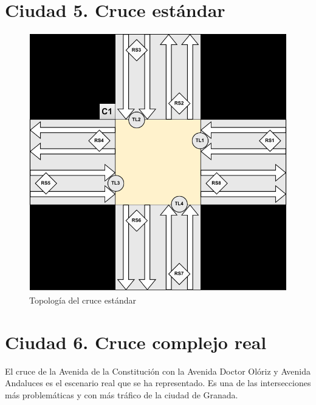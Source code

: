 \section{Ciudad 5. Cruce estándar}
\begin{figure}[H]
    \centering
    \includegraphics[width=1\linewidth]{text/image/DCruc-CEstandar-Topologia.pdf}
    \caption{Topología del cruce estándar}
    \label{fig:cruce_estandar_topologia}
\end{figure}

\newpage
\section{Ciudad 6. Cruce complejo real}
El cruce de la Avenida de la Constitución con la Avenida Doctor Olóriz y Avenida Andaluces es el escenario real que se ha representado. Es una de las intersecciones más problemáticas y con más tráfico de la ciudad de Granada.
